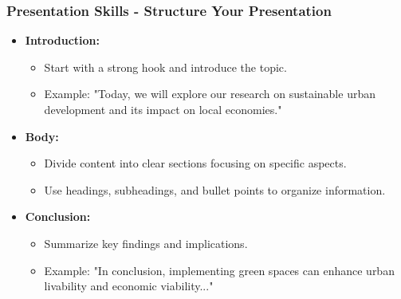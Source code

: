 \documentclass[aspectratio=169]{beamer}
\begin{document}
\begin{frame}[fragile]
    \frametitle{Presentation Skills - Structure Your Presentation}
    \begin{itemize}
        \item \textbf{Introduction:} 
        \begin{itemize}
            \item Start with a strong hook and introduce the topic.
            \item Example: "Today, we will explore our research on sustainable urban development and its impact on local economies."
        \end{itemize}
        
        \item \textbf{Body:} 
        \begin{itemize}
            \item Divide content into clear sections focusing on specific aspects.
            \item Use headings, subheadings, and bullet points to organize information.
        \end{itemize}

        \item \textbf{Conclusion:} 
        \begin{itemize}
            \item Summarize key findings and implications. 
            \item Example: "In conclusion, implementing green spaces can enhance urban livability and economic viability..."
        \end{itemize}
    \end{itemize}
\end{frame}
\end{document}
